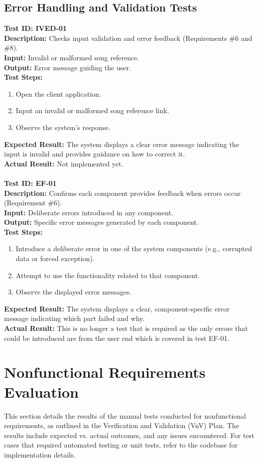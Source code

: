 \documentclass[12pt, titlepage]{article}
\begin{document}
\subsection{Error Handling and Validation Tests}
\textbf{Test ID: IVED-01}\\
\textbf{Description:} Checks input validation and error feedback (Requirements \#6 and \#8).\\
\textbf{Input:} Invalid or malformed song reference.\\
\textbf{Output:} Error message guiding the user.\\
\textbf{Test Steps:}
\begin{enumerate}
    \item Open the client application.
    \item Input an invalid or malformed song reference link.
    \item Observe the system's response.
\end{enumerate}
\textbf{Expected Result:} The system displays a clear error message indicating the input is invalid and provides guidance on how to correct it.\\
\textbf{Actual Result:} Not implemented yet.
\\ \\
\textbf{Test ID: EF-01}\\
\textbf{Description:} Confirms each component provides feedback when errors occur (Requirement \#6).\\
\textbf{Input:} Deliberate errors introduced in any component.\\
\textbf{Output:} Specific error messages generated by each component.\\
\textbf{Test Steps:}
\begin{enumerate}
    \item Introduce a deliberate error in one of the system components (e.g., corrupted data or forced exception).
    \item Attempt to use the functionality related to that component.
    \item Observe the displayed error messages.
\end{enumerate}
\textbf{Expected Result:} The system displays a clear, component-specific error message indicating which part failed and why.\\
\textbf{Actual Result:} This is no longer a test that is required as the only errors that could be introduced are from the user end which is covered in test EF-01.

\section{Nonfunctional Requirements Evaluation}
This section details the results of the manual tests conducted for nonfunctional
requirements, as outlined in the Verification and Validation (VnV) Plan. The
results include expected vs. actual outcomes, and any issues encountered.
For test cases that required automated testing or unit tests, refer to the
codebase for implementation details.
\end{document}
